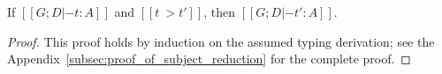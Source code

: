 \begin{lemma}
  \label{lemma:subject_reduction}
  If $[[G;D |- t : A]]$ and $[[t ~> t']]$, then $[[G;D |- t' : A]]$.
\end{lemma}
\begin{proof}
  This proof holds by induction on the assumed typing derivation; see
  the Appendix~\ref{subsec:proof_of_subject_reduction} for the
  complete proof.
\end{proof}
